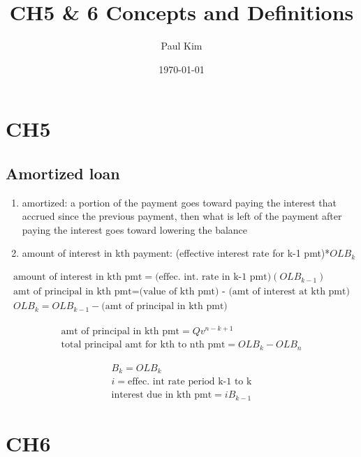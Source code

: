 \documentclass[12pt]{article}
\begin{document}
	
\title{CH5 \& 6 Concepts and Definitions}
\author{Paul Kim}
\date{\today}
\maketitle

\section{CH5}
\subsection{Amortized loan}
\begin{enumerate}
	\item amortized: a portion of the payment goes toward paying the interest that accrued since the previous payment, then what is left of the payment after paying the interest goes toward lowering the balance
	\item amount of interest in kth payment: (effective interest rate for k-1 pmt)*$OLB_k$
\end{enumerate}
\begin{align}
	\text{amount of interest in kth pmt} = \text{(effec. int. rate in k-1 pmt)}(OLB_{k-1}) \nonumber \\
	\text{amt of principal in kth pmt} = \text{(value of kth pmt) - (amt of interest at kth pmt)} \nonumber \\
	OLB_k = OLB_{k-1} - \text{(amt of principal in kth pmt)} \nonumber
\end{align}

\begin{align}
	\text{amt of principal in kth pmt} = Qv^{n-k+1} \nonumber \\
	\text{total principal amt for kth to nth pmt} = OLB_k - OLB_n \nonumber
\end{align}

\begin{align}
	B_k = OLB_k \nonumber \\
	i = \text{effec. int rate period k-1 to k} \nonumber \\
	\text{interest due in kth pmt} = iB_{k-1} \nonumber 
\end{align}


\section{CH6}
\end{document}
